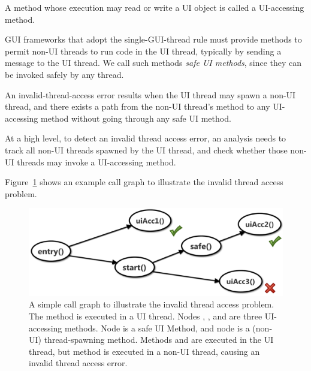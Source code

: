  { A method
whose execution may read or write a UI object is called a UI-accessing method.}\vspace{1mm}

 {GUI frameworks that
adopt the single-GUI-thread rule must provide methods to permit non-UI threads
to run code in the UI thread, typically by sending a message to the UI thread.
We call such methods \textit{safe UI methods}, since
they can be invoked safely by any thread.}\vspace{1mm}

 {An invalid-thread-access error results when the UI thread may spawn a non-UI thread, and there
exists a path from the non-UI thread's  method to any UI-accessing method
without going through any safe UI method. }\vspace{1mm}


At a high level, to detect an invalid thread access error, an analysis needs to track all
non-UI threads spawned by the UI thread, and check whether those non-UI threads
may invoke a UI-accessing method.\vspace{1mm}


 Figure~\ref{fig:simplecg} shows an example call graph
to illustrate the invalid thread access problem.


\begin{figure}[t]
  \centering
  \includegraphics[scale=0.40]{simplecg}
  \vspace*{-1.0ex}\caption {{\label{fig:simplecg} A simple call graph to illustrate the
invalid thread access problem. The  method is executed
in a UI thread. Nodes , , and  are
three UI-accessing methods. Node  is a safe UI Method, and
node  is a (non-UI) thread-spawning method. Methods 
and  are executed in the UI thread, but method 
is executed in a non-UI thread, causing an invalid thread access error.}}
\vspace{-2mm}
\end{figure}


